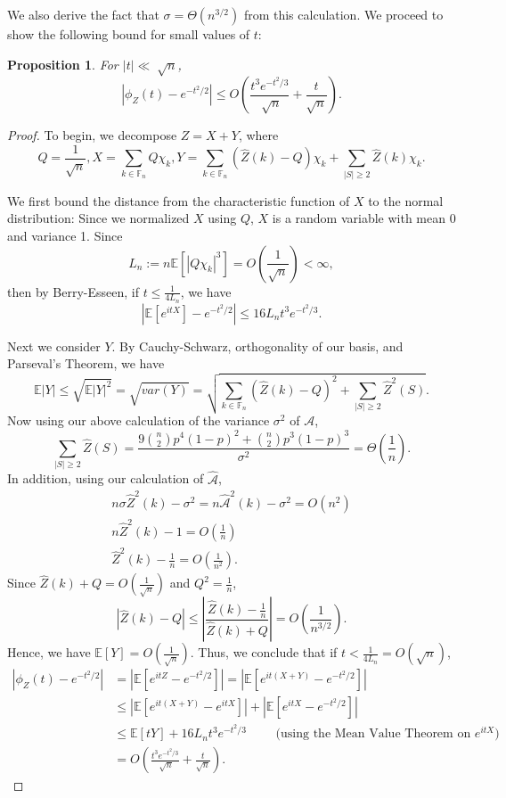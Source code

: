 \documentclass[12pt]{article} %
\newcommand{\p}[1]{\left(#1\right)}
\newcommand{\abs}[1]{\left\lvert#1\right\rvert}
\newcommand{\ap}{\mathcal{A}}
\newcommand{\E}{\mathbb{E}}
\newcommand{\F}{\mathbb{F}}
\newtheorem{prop}[thm]{Proposition}
\theoremstyle{definition}
\theoremstyle{remark}
\begin{document}
We also derive the fact that $\sigma = \Theta(n^{3/2})$ from this calculation. We proceed to show the following bound for small values of $t$: 
\begin{prop}
For $|t| \ll \sqrt[]{n}$, \[ \abs{\phi_Z(t) - e^{-t^2/2}} \leq O\left(\frac{t^3e^{-t^2/3}}{\sqrt[]{n}} + \frac{t}{\sqrt{n}}\right). \]
\end{prop}

\begin{proof}
To begin, we decompose $Z = X+Y$, where
\[Q = \frac{1}{\sqrt{n}}, X = \sum_{k \in \F_n} Q\chi_k, Y = \sum_{k \in \F_n} (\hat{Z}(k)-Q)\chi_k + \sum_{|S| \geq 2} \hat{Z}(k)\chi_k.\]

We first bound the distance from the characteristic function of $X$ to the normal distribution:
Since we normalized $X$ using $Q$, $X$ is a random variable with mean 0 and variance 1. Since \[L_n := n\E[|Q\chi_k|^3] = O\left(\frac{1}{\sqrt{n}}\right) < \infty, \]
then by Berry-Esseen, if $t \leq \frac{1}{4L_n}$, we have \[|\E[e^{itX}] - e^{-t^2/2}| \leq 16L_{n}t^3e^{-t^2/3}.\]

Next we consider $Y$. By Cauchy-Schwarz, orthogonality of our basis, and Parseval's Theorem, we have 
\[ \E|Y| \leq \sqrt{\E|Y|^2} = \sqrt{var(Y)} = \sqrt{\sum_{k \in \F_n} (\hat{Z}(k)-Q)^2 + \sum_{|S| \geq 2} \hat{Z}^2(S)}.\]
Now using our above calculation of the variance $\sigma^2$ of $\ap$, \[\sum_{|S| \geq 2} {\hat{Z}(S)} = \frac{9{{n}\choose{2}}p^4(1-p)^2+{n\choose2}p^3(1-p)^3}{\sigma^2} = \Theta\left(\frac{1}{n}\right).\]
In addition, using our calculation of $\hat{\ap}$,
\begin{align*}
n\sigma\hat{Z}^2(k) - \sigma^2 = n\hat{\ap}^2(k) - \sigma^2 = O(n^2)  \\
n\hat{Z}^2(k) - 1 = O\left(\frac{1}{n} \right) \\
\hat{Z}^2(k) - \frac{1}{n} = O\left(\frac{1}{n^2} \right).
\end{align*}
Since $\hat{Z}(k) + Q = O\left(\frac{1}{\sqrt{n}}\right)$ and $Q^2 = \frac{1}{n}$,
\[ \abs{\hat{Z}(k) - Q} \leq \abs{\frac{\hat{Z}(k) - \frac{1}{n}}{\hat{Z}(k)+Q}} = O\p{\frac{1}{n^{3/2}}}. \]
Hence, we have $\E[Y] = O\left(\frac{1}{\sqrt{n}}\right)$. 
Thus, we conclude that if $t < \frac{1}{4L_n} = O(\sqrt{n})$,
\begin{align*} 
\abs{\phi_Z(t) - e^{-t^2/2}}
&= \abs{\E[e^{itZ}-e^{-t^2/2}]} = \abs{\E[e^{it(X+Y)}-e^{-t^2/2}]} \\
&\leq \abs{\E[e^{it(X+Y)}-e^{itX}]} + \abs{\E[e^{itX}-e^{-t^2/2}]} \\
&\leq \E[tY] + 16L_{n}t^3e^{-t^2/3} \qquad \text{ (using the Mean Value Theorem on } e^{itX})\\
&= O\left(\frac{t^3e^{-t^2/3}}{\sqrt[]{n}} + \frac{t}{\sqrt{n}}\right).
\end{align*}

\end{proof}
\end{document}
